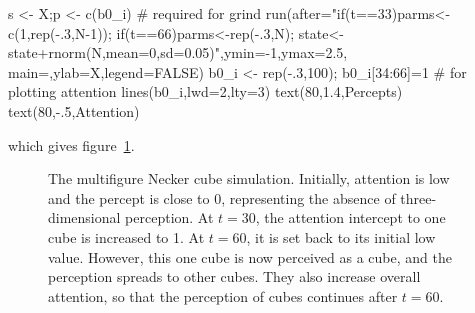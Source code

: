 \documentclass[
  a4paper,
  DIV=11,
  numbers=noendperiod,
  oneside]{scrreprt}
\newenvironment{Shaded}{}{}
\newcommand{\AttributeTok}[1]{\textcolor[rgb]{0.84,0.23,0.29}{#1}}
\newcommand{\CommentTok}[1]{\textcolor[rgb]{0.42,0.45,0.49}{#1}}
\newcommand{\ConstantTok}[1]{\textcolor[rgb]{0.00,0.36,0.77}{#1}}
\newcommand{\DecValTok}[1]{\textcolor[rgb]{0.00,0.36,0.77}{#1}}
\newcommand{\FloatTok}[1]{\textcolor[rgb]{0.00,0.36,0.77}{#1}}
\newcommand{\FunctionTok}[1]{\textcolor[rgb]{0.44,0.26,0.76}{#1}}
\newcommand{\NormalTok}[1]{\textcolor[rgb]{0.14,0.16,0.18}{#1}}
\newcommand{\OtherTok}[1]{\textcolor[rgb]{0.44,0.26,0.76}{#1}}
\newcommand{\SpecialCharTok}[1]{\textcolor[rgb]{0.00,0.36,0.77}{#1}}
\newcommand{\StringTok}[1]{\textcolor[rgb]{0.01,0.18,0.38}{#1}}
\begin{document}
\begin{Shaded}
\begin{Highlighting}[]
\NormalTok{s }\OtherTok{\textless{}{-}}\NormalTok{ X;p }\OtherTok{\textless{}{-}} \FunctionTok{c}\NormalTok{(b0\_i) }\CommentTok{\# required for grind}
\FunctionTok{run}\NormalTok{(}\AttributeTok{after=}\StringTok{"if(t==33)parms\textless{}{-}c(1,rep({-}.3,N{-}1));}
\StringTok{           if(t==66)parms\textless{}{-}rep({-}.3,N);}
\StringTok{           state\textless{}{-}state+rnorm(N,mean=0,sd=0.05)"}\NormalTok{,}\AttributeTok{ymin=}\SpecialCharTok{{-}}\DecValTok{1}\NormalTok{,}\AttributeTok{ymax=}\FloatTok{2.5}\NormalTok{,}
            \AttributeTok{main=}\StringTok{\textquotesingle{}\textquotesingle{}}\NormalTok{,}\AttributeTok{ylab=}\StringTok{\textquotesingle{}X\textquotesingle{}}\NormalTok{,}\AttributeTok{legend=}\ConstantTok{FALSE}\NormalTok{)}
\NormalTok{b0\_i }\OtherTok{\textless{}{-}} \FunctionTok{rep}\NormalTok{(}\SpecialCharTok{{-}}\NormalTok{.}\DecValTok{3}\NormalTok{,}\DecValTok{100}\NormalTok{); b0\_i[}\DecValTok{34}\SpecialCharTok{:}\DecValTok{66}\NormalTok{]}\OtherTok{=}\DecValTok{1} \CommentTok{\# for plotting attention}
\FunctionTok{lines}\NormalTok{(b0\_i,}\AttributeTok{lwd=}\DecValTok{2}\NormalTok{,}\AttributeTok{lty=}\DecValTok{3}\NormalTok{)}
\FunctionTok{text}\NormalTok{(}\DecValTok{80}\NormalTok{,}\FloatTok{1.4}\NormalTok{,}\StringTok{\textquotesingle{}Percepts\textquotesingle{}}\NormalTok{)}
\FunctionTok{text}\NormalTok{(}\DecValTok{80}\NormalTok{,}\SpecialCharTok{{-}}\NormalTok{.}\DecValTok{5}\NormalTok{,}\StringTok{\textquotesingle{}Attention\textquotesingle{}}\NormalTok{)}
\end{Highlighting}
\end{Shaded}

which gives figure~\ref{fig-ch4n-img19-old-67}.

\begin{figure}


\caption{\label{fig-ch4n-img19-old-67}The multifigure Necker cube
simulation. Initially, attention is low and the percept is close to 0,
representing the absence of three-dimensional perception. At \(t = 30\),
the attention intercept to one cube is increased to 1. At \(t = 60\), it
is set back to its initial low value. However, this one cube is now
perceived as a cube, and the perception spreads to other cubes. They
also increase overall attention, so that the perception of cubes
continues after \(t = 60\).}

\end{figure}%
\end{document}
